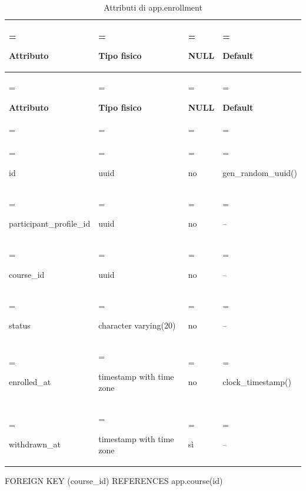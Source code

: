 \documentclass[11pt,a4paper]{article}
\begin{document}
{\small \renewcommand{\arraystretch}{1.2}

\begin{xltabular}{\linewidth}{>{\hsize\linewidth=\hsize\raggedright\arraybackslash}X>{\hsize\linewidth=\hsize\raggedright\arraybackslash}X>{\hsize\linewidth=\hsize\raggedright\arraybackslash}X>{\hsize\linewidth=\hsize\raggedright\arraybackslash}X}
\caption{Attributi di app.enrollment}\label{tab:dictionary-13}\\
\toprule

\textbf{Attributo} & \textbf{Tipo fisico} & \textbf{NULL} & \textbf{Default}\\\midrule\endfirsthead\toprule\textbf{Attributo} & \textbf{Tipo fisico} & \textbf{NULL} & \textbf{Default}\\\midrule\endhead
\midrule{}\\\endfoot\bottomrule\endlastfoot


{\ttfamily\small id} & {\ttfamily\small uuid} & no & {\ttfamily\small gen\_\allowbreak{}random\_\allowbreak{}uuid(\allowbreak{})}\\\addlinespace[3pt]

{\ttfamily\small participant\_\allowbreak{}profile\_\allowbreak{}id} & {\ttfamily\small uuid} & no & {\ttfamily\small --}\\\addlinespace[3pt]

{\ttfamily\small course\_\allowbreak{}id} & {\ttfamily\small uuid} & no & {\ttfamily\small --}\\\addlinespace[3pt]

{\ttfamily\small status} & {\ttfamily\small character varying(\allowbreak{}20)} & no & {\ttfamily\small --}\\\addlinespace[3pt]

{\ttfamily\small enrolled\_\allowbreak{}at} & {\ttfamily\small timestamp with time zone} & no & {\ttfamily\small clock\_\allowbreak{}timestamp(\allowbreak{})}\\\addlinespace[3pt]

{\ttfamily\small withdrawn\_\allowbreak{}at} & {\ttfamily\small timestamp with time zone} & sì & {\ttfamily\small --}\\*

\end{xltabular}}

{\ttfamily\small FOREIGN KEY (\allowbreak{}course\_\allowbreak{}id) REFERENCES app.\allowbreak{}course(\allowbreak{}id)}\par
\end{document}
